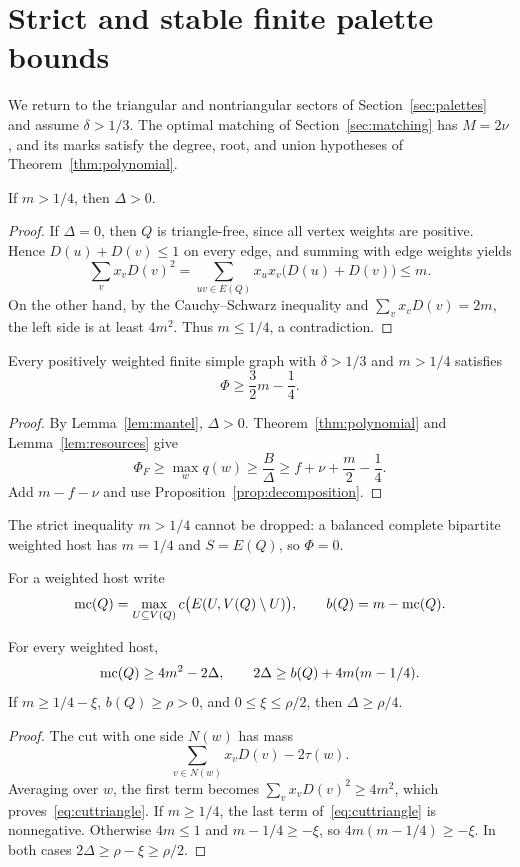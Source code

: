 \section{Strict and stable finite palette bounds}\label{sec:finite}
We return to the triangular and nontriangular sectors of Section~\ref{sec:palettes} and assume $\delta>1/3$. The optimal matching of Section~\ref{sec:matching} has $M=2\nu$, and its marks satisfy the degree, root, and union hypotheses of Theorem~\ref{thm:polynomial}.

\begin{lemma}\label{lem:mantel}
If $m>1/4$, then $\Delta>0$.
\end{lemma}
\begin{proof}
If $\Delta=0$, then $Q$ is triangle-free, since all vertex weights are positive. Hence $D(u)+D(v)\le1$ on every edge, and summing with edge weights yields
\[
 \sum_vx_vD(v)^2
 =\sum_{uv\in E(Q)}x_ux_v\bigl(D(u)+D(v)\bigr)\le m.
\]
On the other hand, by the Cauchy--Schwarz inequality and $\sum_vx_vD(v)=2m$, the left side is at least $4m^2$. Thus $m\le1/4$, a contradiction.
\end{proof}

\begin{theorem}\label{thm:finite}
Every positively weighted finite simple graph with $\delta>1/3$ and $m>1/4$ satisfies
\begin{equation}\label{eq:finite}
 \Phi\ge\frac32m-\frac14.
\end{equation}
\end{theorem}
\begin{proof}
By Lemma~\ref{lem:mantel}, $\Delta>0$. Theorem~\ref{thm:polynomial} and Lemma~\ref{lem:resources} give
\[
 \Phi_F\ge\max_wq(w)\ge\frac B\Delta
 \ge f+\nu+\frac m2-\frac14.
\]
Add $m-f-\nu$ and use Proposition~\ref{prop:decomposition}.
\end{proof}
The strict inequality $m>1/4$ cannot be dropped: a balanced complete bipartite weighted host has $m=1/4$ and $S=E(Q)$, so $\Phi=0$.

For a weighted host write
\[
 \operatorname{mc}(Q)=\max_{U\subseteq V(Q)}c\bigl(E(U,V(Q)\setminus U)\bigr),
 \qquad b(Q)=m-\operatorname{mc}(Q).
\]

\begin{lemma}\label{lem:cuttriangle}
For every weighted host,
\begin{equation}\label{eq:cuttriangle}
 \operatorname{mc}(Q)\ge4m^2-2\Delta,
 \qquad 2\Delta\ge b(Q)+4m(m-1/4).
\end{equation}
If $m\ge1/4-\xi$, $b(Q)\ge\rho>0$, and $0\le\xi\le\rho/2$, then $\Delta\ge\rho/4$.
\end{lemma}
\begin{proof}
The cut with one side $N(w)$ has mass
\[
 \sum_{v\in N(w)}x_vD(v)-2\tau(w).
\]
Averaging over $w$, the first term becomes $\sum_vx_vD(v)^2\ge4m^2$, which proves~\eqref{eq:cuttriangle}. If $m\ge1/4$, the last term of~\eqref{eq:cuttriangle} is nonnegative. Otherwise $4m\le1$ and $m-1/4\ge-\xi$, so $4m(m-1/4)\ge-\xi$. In both cases $2\Delta\ge\rho-\xi\ge\rho/2$.
\end{proof}

